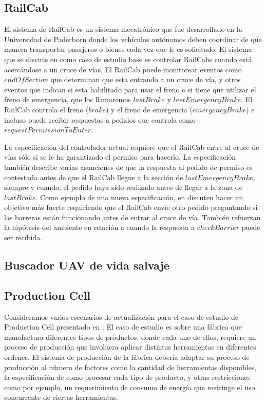 \subsection{RailCab}

El sistema de RailCab es un sistema mecatrónico que fue desarrollado en la Universidad de Paderborn \cite{railcab} donde
los vehículos autónomos deben coordinar de que manera transportar pasajeros o bienes cada vez que le es solicitado. El
sistema que se discute en \cite{6224401} como caso de estudio base es controlar RailCabs cuando está acercándose a un
cruce de vías. El RailCab puede monitorear eventos como $endOfSection$ que determinan que esta entrando a un cruce de
vía, y otros eventos que indican si esta habilitado para usar el freno o si tiene que utilizar el freno de emergencia,
que los llamaremos $lastBrake$ y $lastEmergencyBrake$. El RailCab controla el freno ($brake$) y el freno de emergencia
($emergencyBrake$) e incluso puede recibir respuestas a pedidos que controla como $requestPermissionToEnter$.

La especificación del controlador actual requiere que el RailCab entre al cruce de vías sólo si se le ha garantizado el
permiso para hacerlo. La especificación también describe varias asunciones de que la respuesta al pedido de permiso es
contestada antes de que el RailCab llegue a la sección de $lastEmergencyBrake$, siempre y cuando, el pedido haya sido
realizado antes de llegar a la zona de $lastBrake$. Como ejemplo de una nueva especificación, en \cite{6224401} discuten
hacer un objetivo más fuerte requiriendo que el RailCab envíe otro pedido preguntando si las barreras están funcionando
antes de entrar al cruce de vía. También refuerzan la hipótesis del ambiente en relación a cuando la respuesta a
$checkBarrier$ puede ser recibida.

\subsection{Buscador UAV de vida salvaje}
\label{buscador_UAV}


\subsection{Production Cell}

Consideramos varios escenarios de actualización para el caso de estudio de Production Cell presentado en
\cite{Lewerentz:1995:646391}. El caso de estudio es sobre una fábrica que manofactura diferentes tipos de productos,
donde cada uno de ellos, requiere un proceso de producción que involucra aplicar distintas herramientas en
diferentes ordenes. El sistema de producción de la fábrica debería adaptar su proceso de producción al número de
factores como la cantidad de herramientas disponibles, la especificación de como procesar cada tipo de producto, y otras
restricciones como por ejemplo, un requerimiento de consumo de energía que restringe el uso concurrente de ciertas
herramientas.


